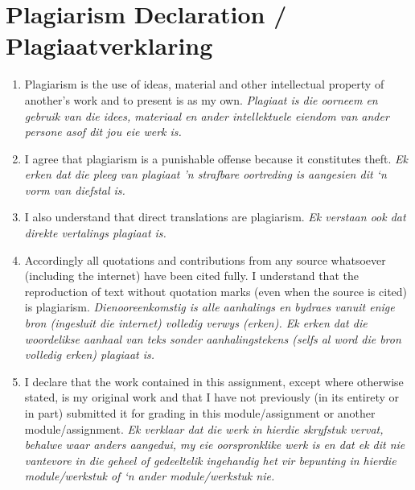 \documentclass[12pt,a4paper]{report}
\begin{document}
\section*{Plagiarism Declaration / Plagiaatverklaring}
\begin{enumerate}
\item Plagiarism is the use of ideas, material and other intellectual property of another's work and to present is as my own. \newline \textit{Plagiaat is die oorneem en gebruik van die idees, materiaal en ander intellektuele eiendom van ander persone asof dit jou eie werk is.} 
\item I agree that plagiarism is a punishable offense because it constitutes theft. \newline \textit{Ek erken dat die pleeg van plagiaat 'n strafbare oortreding is aangesien dit ‘n vorm van diefstal is. }
\item I also understand that direct translations are plagiarism. \newline \textit{Ek verstaan ook dat direkte vertalings plagiaat is. }
\item Accordingly all quotations and contributions from any source whatsoever (including the internet) have been cited fully. I understand that the reproduction of text without quotation marks (even when the source is cited) is plagiarism. \newline \textit{Dienooreenkomstig is alle aanhalings en bydraes vanuit enige bron (ingesluit die internet) volledig verwys (erken). Ek erken dat die woordelikse aanhaal van teks sonder aanhalingstekens (selfs al word die bron volledig erken) plagiaat is. }
\item I declare that the work contained in this assignment, except where otherwise stated, is my original work and that I have not previously (in its entirety or in part) submitted it for grading in this module/assignment or another module/assignment. \newline \textit{Ek verklaar dat die werk in hierdie skryfstuk vervat, behalwe waar anders aangedui, my eie oorspronklike werk is en dat ek dit nie vantevore in die geheel of gedeeltelik ingehandig het vir bepunting in hierdie module/werkstuk of ‘n ander module/werkstuk nie.} 
\end{enumerate}
\vspace{1cm}
\end{document}
